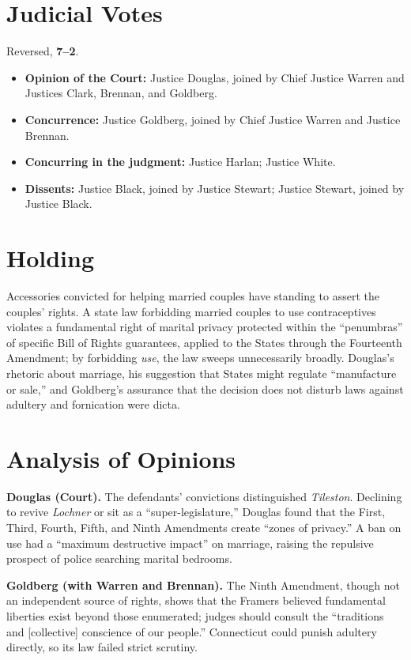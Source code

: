 \documentclass[12pt]{article}
\begin{document}
\section{Judicial Votes}

Reversed, \textbf{7--2}.
\begin{itemize}
\item \textbf{Opinion of the Court:} Justice Douglas, joined by Chief Justice Warren and Justices Clark, Brennan, and Goldberg.
\item \textbf{Concurrence:} Justice Goldberg, joined by Chief Justice Warren and Justice Brennan.
\item \textbf{Concurring in the judgment:} Justice Harlan; Justice White.
\item \textbf{Dissents:} Justice Black, joined by Justice Stewart; Justice Stewart, joined by Justice Black.
\end{itemize}

\section{Holding}

Accessories convicted for helping married couples have standing to assert the couples' rights. A state law forbidding married couples to use contraceptives violates a fundamental right of marital privacy protected within the ``penumbras'' of specific Bill of Rights guarantees, applied to the States through the Fourteenth Amendment; by forbidding \textit{use}, the law sweeps unnecessarily broadly. Douglas's rhetoric about marriage, his suggestion that States might regulate ``manufacture or sale,'' and Goldberg's assurance that the decision does not disturb laws against adultery and fornication were dicta.

\section{Analysis of Opinions}

\textbf{Douglas (Court).} The defendants' convictions distinguished \textit{Tileston}. Declining to revive \textit{Lochner} or sit as a ``super-legislature,'' Douglas found that the First, Third, Fourth, Fifth, and Ninth Amendments create ``zones of privacy.'' A ban on use had a ``maximum destructive impact'' on marriage, raising the repulsive prospect of police searching marital bedrooms.

\textbf{Goldberg (with Warren and Brennan).} The Ninth Amendment, though not an independent source of rights, shows that the Framers believed fundamental liberties exist beyond those enumerated; judges should consult the ``traditions and [collective] conscience of our people.'' Connecticut could punish adultery directly, so its law failed strict scrutiny.
\end{document}
